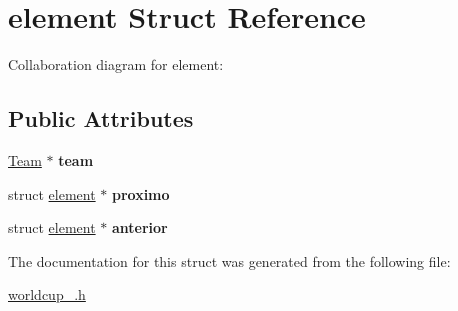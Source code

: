 \hypertarget{structelement}{}\section{element Struct Reference}
\label{structelement}


Collaboration diagram for element\+:
\subsection*{Public Attributes}
\begin{DoxyCompactItemize}
\item 
\hyperlink{structTeam}{Team} $\ast$ {\bfseries team}\hypertarget{structelement_a4b38b3225163e6f567a2a175def1a549}{}\label{structelement_a4b38b3225163e6f567a2a175def1a549}

\item 
struct \hyperlink{structelement}{element} $\ast$ {\bfseries proximo}\hypertarget{structelement_af9e01eb8112eb2a48e254c35ba3bb9f3}{}\label{structelement_af9e01eb8112eb2a48e254c35ba3bb9f3}

\item 
struct \hyperlink{structelement}{element} $\ast$ {\bfseries anterior}\hypertarget{structelement_aab000fe94ec63de4497876f9e7e7d009}{}\label{structelement_aab000fe94ec63de4497876f9e7e7d009}

\end{DoxyCompactItemize}


The documentation for this struct was generated from the following file\+:\begin{DoxyCompactItemize}
\item 
\hyperlink{worldcup__2018_8h}{worldcup\+\_.\+h}\end{DoxyCompactItemize}
